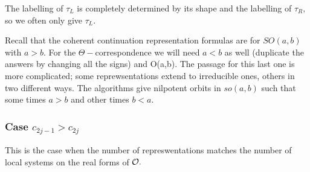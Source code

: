 \documentclass[11pt ,reqno]{amsart}
\begin{document}
The labelling of $\tau_L$ is completely determined by its shape and
the labelling of $\tau_R,$ so we often only give $\tau_L$. 

\bigskip
Recall that the coherent continuation representation formulas are for
$SO(a,b)$ with $a>b.$ For the $\Theta-$correspondence we will need
$a<b$ as well (duplicate the answers by changing all the signs) and
O(a,b). The passage for this last one is more complicated; some
reprewsentations extend to irreducible ones, others in two different ways.
The algorithms give nilpotent orbits in $so(a,b)$ such that some times
$a>b$ and other times $b<a.$ 

\subsubsection{Case $c_{2j-1}>c_{2j}$} This is the case when the
number of represwentations matches the number of local systems on the
real forms of $\mathcal O.$
\end{document}
